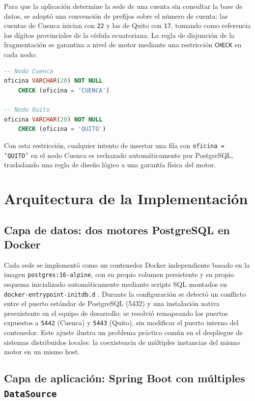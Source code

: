 \documentclass[conference]{IEEEtran}
\begin{document}
Para que la aplicaci\'on determine la sede de una cuenta sin consultar la base
de datos, se adopt\'o una convenci\'on de prefijos sobre el n\'umero de cuenta:
las cuentas de Cuenca inician con \texttt{22} y las de Quito con \texttt{17},
tomando como referencia los d\'igitos provinciales de la c\'edula ecuatoriana.
La regla de disjunci\'on de la fragmentaci\'on se garantiza a nivel de motor
mediante una restricci\'on \texttt{CHECK} en cada nodo:

\begin{lstlisting}[language=SQL]
-- Nodo Cuenca
oficina VARCHAR(20) NOT NULL
    CHECK (oficina = 'CUENCA')

-- Nodo Quito
oficina VARCHAR(20) NOT NULL
    CHECK (oficina = 'QUITO')
\end{lstlisting}

Con esta restricci\'on, cualquier intento de insertar una fila con
\texttt{oficina = 'QUITO'} en el nodo Cuenca es rechazado autom\'aticamente
por PostgreSQL, trasladando una regla de dise\~no l\'ogico a una garant\'ia
f\'isica del motor.

\section{Arquitectura de la Implementaci\'on}

\subsection{Capa de datos: dos motores PostgreSQL en Docker}

Cada sede se implement\'o como un contenedor Docker independiente basado en la
imagen \texttt{postgres:16-alpine}, con su propio volumen persistente y su
propio esquema inicializado autom\'aticamente mediante scripts SQL montados en
\texttt{docker-entrypoint-initdb.d} \cite{docker2024}. Durante la configuraci\'on
se detect\'o un conflicto entre el puerto est\'andar de PostgreSQL (5432) y una
instalaci\'on nativa preexistente en el equipo de desarrollo; se resolvi\'o
remapeando los puertos expuestos a \texttt{5442} (Cuenca) y \texttt{5443}
(Quito), sin modificar el puerto interno del contenedor. Este ajuste ilustra
un problema pr\'actico com\'un en el despliegue de sistemas distribuidos
locales: la coexistencia de m\'ultiples instancias del mismo motor en un
mismo host.

\subsection{Capa de aplicaci\'on: Spring Boot con m\'ultiples \texttt{DataSource}}
\end{document}
